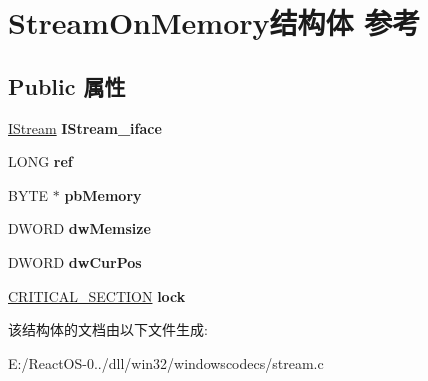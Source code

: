 \hypertarget{struct_stream_on_memory}{}\section{Stream\+On\+Memory结构体 参考}
\label{struct_stream_on_memory}
\subsection*{Public 属性}
\begin{DoxyCompactItemize}
\item 
\mbox{\label{struct_stream_on_memory_a094b83b5190da2646d5c3d6cdd1aa314}} 
\hyperlink{interface_i_stream}{I\+Stream} {\bfseries I\+Stream\+\_\+iface}
\item 
\mbox{\label{struct_stream_on_memory_ae8d72d07b176b9ed1307923fcf212213}} 
L\+O\+NG {\bfseries ref}
\item 
\mbox{\label{struct_stream_on_memory_a0585bf44754823d150c79d35c79bb080}} 
B\+Y\+TE $\ast$ {\bfseries pb\+Memory}
\item 
\mbox{\label{struct_stream_on_memory_ad904d9fccf87bed641a228c1bcd8aad5}} 
D\+W\+O\+RD {\bfseries dw\+Memsize}
\item 
\mbox{\label{struct_stream_on_memory_a5474d02d7c6f9b51658b3ec2fcf873b5}} 
D\+W\+O\+RD {\bfseries dw\+Cur\+Pos}
\item 
\mbox{\label{struct_stream_on_memory_ae2aeb57bdda9ea173603071a852fdcf7}} 
\hyperlink{struct___c_r_i_t_i_c_a_l___s_e_c_t_i_o_n}{C\+R\+I\+T\+I\+C\+A\+L\+\_\+\+S\+E\+C\+T\+I\+ON} {\bfseries lock}
\end{DoxyCompactItemize}


该结构体的文档由以下文件生成\+:\begin{DoxyCompactItemize}
\item 
E\+:/\+React\+O\+S-\/0../dll/win32/windowscodecs/stream.\+c\end{DoxyCompactItemize}
